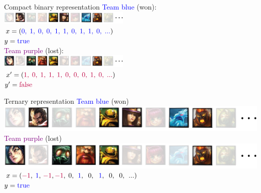 \begin{frame}{Compact binary representation}
\centering
\textcolor{blue}{Team blue} (won):\\
\hspace{20pt}\includegraphics[width=0.47\textwidth]{img/kent/pickblue.png}\\
\vspace{8pt}
$x = (\textcolor{blue}{0,\;1,\;0,\;0,\;1,\;1,\;0,\;1,\;1,\;0,\;...})$\\
$y = \textcolor{blue}{\text{true}}$\\
\vspace{40pt}
\textcolor{purple}{Team purple} (lost):\\
\hspace{20pt}\includegraphics[width=0.47\textwidth]{img/kent/pickpurple.png}\\
\vspace{8pt}
$x' = (\textcolor{purple}{1,\;0,\;1,\;1,\;1,\;0,\;0,\;0,\;1,\;0,\;...})$\\
$y' = \textcolor{purple}{\text{false}}$
\end{frame}

\begin{frame}{Ternary representation}
\centering
\textcolor{blue}{Team blue} (won)\\
\hspace{20pt}\includegraphics[scale=0.31]{img/kent/pickblue.png}\\
\vspace{20pt}
\textcolor{purple}{Team purple} (lost)\\
\hspace{20pt}\includegraphics[scale=0.31]{img/kent/pickpurple.png}\\
\vspace{20pt}
$x = (\textcolor{purple}{-1},\;\textcolor{blue}{1},\,\textcolor{purple}{-1},\textcolor{purple}{-1},\;0,\;\,\textcolor{blue}{1},\;\;0,\;\,\,\textcolor{blue}{1},\;\;0,\;\;0,\;\,...)$\\
$y = \textcolor{blue}{\text{true}}$\\
\end{frame}

